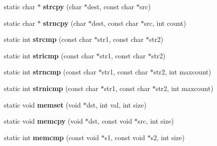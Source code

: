 \begin{DoxyCompactItemize}
\item 
static char $\ast$ {\bfseries strcpy} (char $\ast$dest, const char $\ast$src)\hypertarget{class_magnum_1_1_system_a3e63cd6d0d2e3e76cc7fc5a7876560d5}{}\label{class_magnum_1_1_system_a3e63cd6d0d2e3e76cc7fc5a7876560d5}

\item 
static char $\ast$ {\bfseries strncpy} (char $\ast$dest, const char $\ast$src, int count)\hypertarget{class_magnum_1_1_system_ad7b84bec292c7b5597817426c3960aa7}{}\label{class_magnum_1_1_system_ad7b84bec292c7b5597817426c3960aa7}

\item 
static int {\bfseries strcmp} (const char $\ast$str1, const char $\ast$str2)\hypertarget{class_magnum_1_1_system_a6bd49b730b534ad7f38a7d1fd2fc0ea1}{}\label{class_magnum_1_1_system_a6bd49b730b534ad7f38a7d1fd2fc0ea1}

\item 
static int {\bfseries stricmp} (const char $\ast$str1, const char $\ast$str2)\hypertarget{class_magnum_1_1_system_af2a9ec0778c2ec4f275fdbf589c941ac}{}\label{class_magnum_1_1_system_af2a9ec0778c2ec4f275fdbf589c941ac}

\item 
static int {\bfseries strncmp} (const char $\ast$str1, const char $\ast$str2, int maxcount)\hypertarget{class_magnum_1_1_system_a33cc1034ebfb3bff7bbe2a8964ce1d12}{}\label{class_magnum_1_1_system_a33cc1034ebfb3bff7bbe2a8964ce1d12}

\item 
static int {\bfseries strnicmp} (const char $\ast$str1, const char $\ast$str2, int maxcount)\hypertarget{class_magnum_1_1_system_af492a62687c5ee5b22f0b3998ae3ccef}{}\label{class_magnum_1_1_system_af492a62687c5ee5b22f0b3998ae3ccef}

\item 
static void {\bfseries memset} (void $\ast$dst, int val, int size)\hypertarget{class_magnum_1_1_system_a21d5c35e2d6339008b7ba8ac7f771153}{}\label{class_magnum_1_1_system_a21d5c35e2d6339008b7ba8ac7f771153}

\item 
static void {\bfseries memcpy} (void $\ast$dst, const void $\ast$src, int size)\hypertarget{class_magnum_1_1_system_ab15ca31db328a20ebdae3604b43273d0}{}\label{class_magnum_1_1_system_ab15ca31db328a20ebdae3604b43273d0}

\item 
static int {\bfseries memcmp} (const void $\ast$s1, const void $\ast$s2, int size)\hypertarget{class_magnum_1_1_system_a427eeddcacbeb63ee4f82544a56dfd3f}{}\label{class_magnum_1_1_system_a427eeddcacbeb63ee4f82544a56dfd3f}


\end{DoxyCompactItemize}
